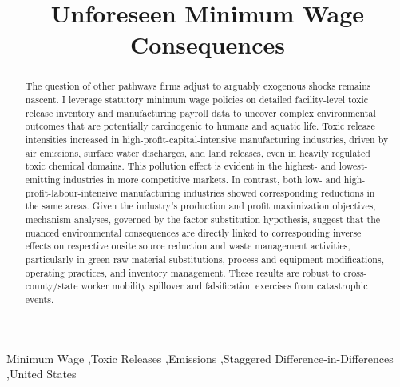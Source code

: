 \documentclass[authoryear, preprint, twocolumn, 1p]{elsarticle}
\begin{document}
    \begin{frontmatter}
        \title{Unforeseen Minimum Wage Consequences}
%
        \begin{abstract}
            \noindent The question of other pathways firms adjust to arguably exogenous shocks remains nascent. I leverage statutory minimum wage policies on detailed facility-level toxic release inventory and manufacturing payroll data to uncover complex environmental outcomes that are potentially carcinogenic to humans and aquatic life. Toxic release intensities increased in high-profit-capital-intensive manufacturing industries, driven by air emissions, surface water discharges, and land releases, even in heavily regulated toxic chemical domains. This pollution effect is evident in the highest- and lowest-emitting industries in more competitive markets. In contrast, both low- and high-profit-labour-intensive manufacturing industries showed corresponding reductions in the same areas. Given the industry's production and profit maximization objectives, mechanism analyses, governed by the factor-substitution hypothesis, suggest that the nuanced environmental consequences are directly linked to corresponding inverse effects on respective onsite source reduction and waste management activities, particularly in green raw material substitutions, process and equipment modifications, operating practices, and inventory management. These results are robust to cross-county/state worker mobility spillover and falsification exercises from catastrophic events.

        \end{abstract}
        \begin{keyword}
            Minimum Wage \sep Toxic Releases \sep Emissions \sep Staggered Difference-in-Differences \sep United States
        \end{keyword}
    \end{frontmatter}
\end{document}
